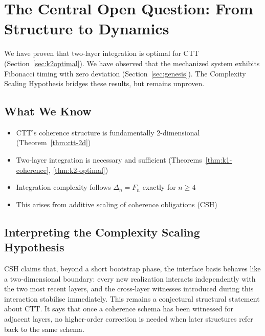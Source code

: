 \documentclass[11pt]{article}
\theoremstyle{definition}
\theoremstyle{plain}
\theoremstyle{remark}
\begin{document}
\section{The Central Open Question: From Structure to Dynamics}
\label{sec:discussion}

We have proven that two-layer integration is optimal for CTT (Section~\ref{sec:k2optimal}). 
We have observed that the mechanized system exhibits Fibonacci timing with zero deviation 
(Section~\ref{sec:genesis}). The Complexity Scaling Hypothesis bridges these results, 
but remains unproven.

\subsection{What We Know}

\begin{itemize}
\item[\textbf{Proven:}] CTT's coherence structure is fundamentally 2-dimensional 
(Theorem~\ref{thm:ctt-2d})
\item[\textbf{Proven:}] Two-layer integration is necessary and sufficient 
(Theorems~\ref{thm:k1-coherence}, \ref{thm:k2-optimal})
\item[\textbf{Observed:}] Integration complexity follows $\Delta_n = F_n$ exactly 
for $n \geq 4$
\item[\textbf{Conjectured:}] This arises from additive scaling of coherence 
obligations (CSH)
\end{itemize}

\subsection{Interpreting the Complexity Scaling Hypothesis}

CSH claims that, beyond a short bootstrap phase, the interface basis behaves like a two-dimensional boundary: every new realization interacts independently with the two most recent layers, and the cross-layer witnesses introduced during this interaction stabilise immediately. This remains a conjectural structural statement about CTT. It says that once a coherence schema has been witnessed for adjacent layers, no higher-order correction is needed when later structures refer back to the same schema.
\end{document}

